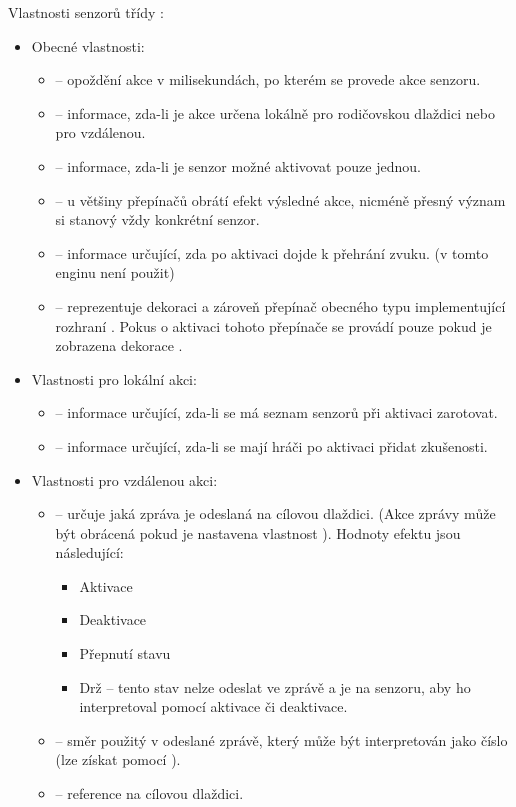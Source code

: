 Vlastnosti senzorů třídy :
\begin{itemize}
\item Obecné vlastnosti:
	\begin{itemize}
	\item {} -- opoždění akce v milisekundách, po kterém se provede akce senzoru.
	\item {} -- informace, zda-li je akce určena lokálně pro rodičovskou dlaždici nebo pro vzdálenou.
	\item {} -- informace, zda-li je senzor možné aktivovat pouze jednou.
	\item {} -- u většiny přepínačů obrátí efekt výsledné akce, nicméně přesný význam si stanový vždy konkrétní senzor. 
	\item {} -- informace určující, zda po aktivaci dojde k přehrání zvuku.  (v tomto enginu není použit)
	\item {} -- reprezentuje dekoraci a zároveň přepínač obecného typu implementující rozhraní .
			Pokus o aktivaci tohoto přepínače se provádí pouze pokud je zobrazena dekorace .
	\end{itemize}

\item Vlastnosti pro lokální akci:
	\begin{itemize}
	\item {} -- informace určující, zda-li se má seznam senzorů při aktivaci zarotovat.
	\item {} -- informace určující, zda-li se mají hráči po aktivaci přidat zkušenosti.
	\end{itemize}

\item Vlastnosti pro vzdálenou akci:
	\begin{itemize}
	\item {} -- určuje jaká zpráva je odeslaná na cílovou dlaždici.  (Akce zprávy může být obrácená pokud je nastavena vlastnost ).
	Hodnoty efektu jsou následující:
		\begin{itemize}
		\item Aktivace 
		\item Deaktivace
		\item Přepnutí stavu
		\item Drž -- tento stav nelze odeslat ve zprávě a je na senzoru, aby ho interpretoval pomocí aktivace či deaktivace.
		\end{itemize}
	\item {} -- směr použitý v odeslané zprávě, který může být interpretován jako číslo (lze získat pomocí ).
	\item {} -- reference na cílovou dlaždici.
	\end{itemize}
\end{itemize}

